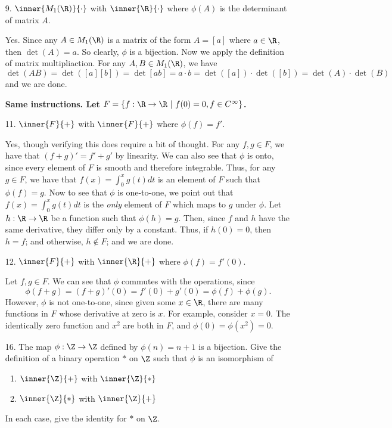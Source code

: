 \documentclass[letterpaper]{article}
\begin{document}
\begin{enumerate}
\item[9.] $\inner{M_1(\R)}{\cdot}$ with $\inner{\R}{\cdot}$ where $\phi(A)$ is the determinant of matrix $A$. 

\answer Yes. Since any $A\in M_1(\R)$ is a matrix of the form $A=\left[a\right]$ where $a\in\R$, then $\det(A)=a$. So clearly, $\phi$ is a bijection. Now we apply the definition of matrix multipliaction. For any $A,B\in M_1(\R)$, we have $$\det(AB)=\det([a][b])=\det[ab]=a\cdot b=\det([a])\cdot\det([b])=\det(A)\cdot\det(B)$$ and we are done. 

\hspace*{-0.74cm}
\textbf{Same instructions. Let $F=\{f:\R\to\R \, \, | \, \, f(0)=0, f\in C^\infty\}$.}

\item[11.] $\inner{F}{+}$ with $\inner{F}{+}$ where $\phi(f)=f'$. 

\answer Yes, though verifying this does require a  bit of thought. For any $f, g\in F$, we have that $(f+g)'=f'+g'$ by linearity. We can also see that $\phi$ is onto, since every element of $F$ is smooth and therefore integrable. Thus, for any $g\in F$, we have that $f(x)=\int_0^x g(t)dt$ is an element of $F$ such that $\phi(f)=g$. Now to see that $\phi$ is one-to-one, we point out that $f(x)=\int_0^x g(t)dt$ is the \emph{only} element of $F$ which maps to $g$ under $\phi$. Let $h:\R\to\R$ be a function such that $\phi(h)=g$. Then, since $f$ and $h$ have the same derivative, they differ only by a constant. Thus, if $h(0)=0$, then $h=f$; and otherwise, $h\not\in F$; and we are done. 

\item[12.] $\inner{F}{+}$ with $\inner{\R}{+}$ where $\phi(f)=f'(0)$. 

\answer Let $f,g\in F$. We can see that $\phi$ commutes with the operations, since $$\phi(f+g)=(f+g)'(0)=f'(0)+g'(0)=\phi(f)+\phi(g).$$ However, $\phi$ is not one-to-one, since given some $x\in\R$, there are many functions in $F$ whose derivative at zero is $x$. For example, consider $x=0$. The identically zero function and $x^2$ are both in $F$, and $\phi(0)=\phi(x^2)=0$. 

\item[16.] The map $\phi:\Z\to\Z$ defined by $\phi(n)=n+1$ is a bijection. Give the definition of a binary operation $*$ on $\Z$ such that $\phi$ is an isomorphism of 
	\begin{enumerate}[label=\alph*.]
	\item $\inner{\Z}{+}$ with $\inner{\Z}{*}$
	\item $\inner{\Z}{*}$ with $\inner{\Z}{+}$
	\end{enumerate}
In each case, give the identity for $*$ on $\Z$. 


\end{enumerate}
\end{document}
